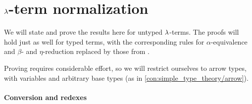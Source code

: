 \section{\texorpdfstring{\( {\mathrm \lambda} \)}{λ}-term normalization}\label{sec:lambda_term_normalization}

We will state and prove the results here for untyped \( {\mathrm \lambda} \)-terms. The proofs will hold just as well for typed terms, with the corresponding rules for \( \alpha \)-equivalence and \( \beta \)- and \( \eta \)-reduction replaced by those from .

Proving  requires considerable effort, so we will restrict ourselves to arrow types, with variables and arbitrary base types (as in \cref{con:simple_type_theory/arrow}).

\paragraph{Conversion and redexes}

